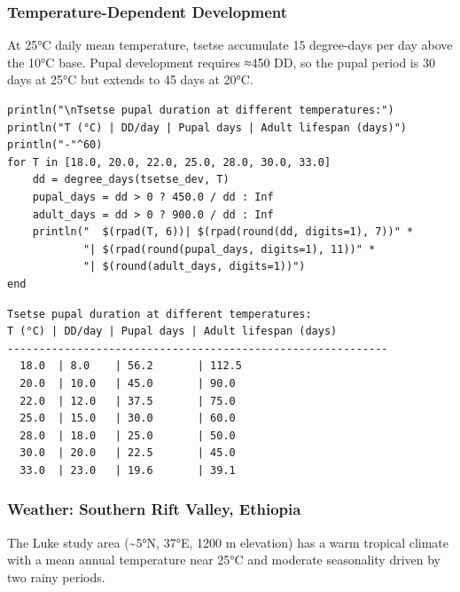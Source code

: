 \subsubsection{Temperature-Dependent Development}



\label{15941437142734452181}{}


At 25°C daily mean temperature, tsetse accumulate 15 degree-days per day above the 10°C base. Pupal development requires ≈450 DD, so the pupal period is 30 days at 25°C but extends to 45 days at 20°C.




\begin{verbatim}
println("\nTsetse pupal duration at different temperatures:")
println("T (°C) | DD/day | Pupal days | Adult lifespan (days)")
println("-"^60)
for T in [18.0, 20.0, 22.0, 25.0, 28.0, 30.0, 33.0]
    dd = degree_days(tsetse_dev, T)
    pupal_days = dd > 0 ? 450.0 / dd : Inf
    adult_days = dd > 0 ? 900.0 / dd : Inf
    println("  $(rpad(T, 6))| $(rpad(round(dd, digits=1), 7))" *
            "| $(rpad(round(pupal_days, digits=1), 11))" *
            "| $(round(adult_days, digits=1))")
end
\end{verbatim}




\begin{verbatim}
Tsetse pupal duration at different temperatures:
T (°C) | DD/day | Pupal days | Adult lifespan (days)
------------------------------------------------------------
  18.0  | 8.0    | 56.2       | 112.5
  20.0  | 10.0   | 45.0       | 90.0
  22.0  | 12.0   | 37.5       | 75.0
  25.0  | 15.0   | 30.0       | 60.0
  28.0  | 18.0   | 25.0       | 50.0
  30.0  | 20.0   | 22.5       | 45.0
  33.0  | 23.0   | 19.6       | 39.1
\end{verbatim}



\subsubsection{Weather: Southern Rift Valley, Ethiopia}



\label{12968777746922011378}{}


The Luke study area ({\textasciitilde}5°N, 37°E, 1200 m elevation) has a warm tropical climate with a mean annual temperature near 25°C and moderate seasonality driven by two rainy periods.





